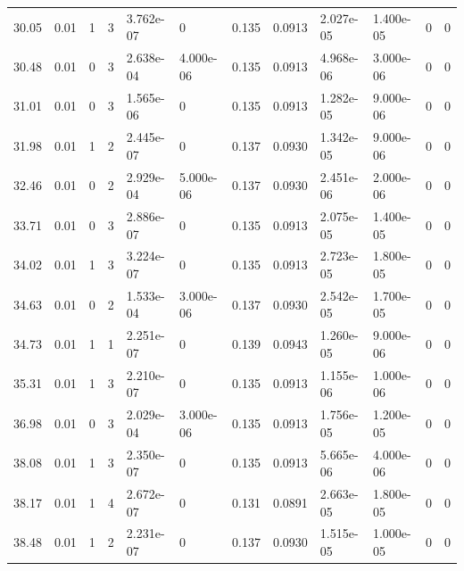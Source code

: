 \documentclass[preview]{standalone}
\begin{document}
{{\begin{tabular}{L{1.2cm}C{1.2cm} C{0.3cm}C{0.5cm} C{1.4cm}C{1.4cm} C{1.4cm}C{1.4cm} C{1.6cm}C{1.6cm} C{1.6cm}C{1.6cm}}
  30.05  &  0.01  & 1     &  3 &  3.762e-07  & 0  &  0.135&   0.0913& 2.027e-05 & 1.400e-05   &  0 & 0  \\ 
  30.48  &  0.01  & 0     &  3 &  2.638e-04  & 4.000e-06  &  0.135&   0.0913& 4.968e-06 & 3.000e-06   &  0 & 0  \\ 
  31.01  &  0.01  & 0     &  3 &  1.565e-06  & 0  &  0.135&   0.0913& 1.282e-05 & 9.000e-06   &  0 & 0  \\ 
  31.98  &  0.01  & 1     &  2 &  2.445e-07  & 0  &  0.137&   0.0930& 1.342e-05 & 9.000e-06   &  0 & 0  \\ 
  32.46  &  0.01  & 0     &  2 &  2.929e-04  & 5.000e-06  &  0.137&   0.0930& 2.451e-06 & 2.000e-06   &  0 & 0  \\ 
  33.71  &  0.01  & 0     &  3 &  2.886e-07  & 0  &  0.135&   0.0913& 2.075e-05 & 1.400e-05   &  0 & 0  \\ 
  34.02  &  0.01  & 1     &  3 &  3.224e-07  & 0  &  0.135&   0.0913& 2.723e-05 & 1.800e-05   &  0 & 0  \\ 
  34.63  &  0.01  & 0     &  2 &  1.533e-04  & 3.000e-06  &  0.137&   0.0930& 2.542e-05 & 1.700e-05   &  0 & 0  \\ 
  34.73  &  0.01  & 1     &  1 &  2.251e-07  & 0  &  0.139&   0.0943& 1.260e-05 & 9.000e-06   &  0 & 0  \\ 
  35.31  &  0.01  & 1     &  3 &  2.210e-07  & 0  &  0.135&   0.0913& 1.155e-06 & 1.000e-06   &  0 & 0  \\ 
  36.98  &  0.01  & 0     &  3 &  2.029e-04  & 3.000e-06  &  0.135&   0.0913& 1.756e-05 & 1.200e-05   &  0 & 0  \\ 
  38.08  &  0.01  & 1     &  3 &  2.350e-07  & 0  &  0.135&   0.0913& 5.665e-06 & 4.000e-06   &  0 & 0  \\ 
  38.17  &  0.01  & 1     &  4 &  2.672e-07  & 0  &  0.131&   0.0891& 2.663e-05 & 1.800e-05   &  0 & 0  \\ 
  38.48  &  0.01  & 1     &  2 &  2.231e-07  & 0  &  0.137&   0.0930& 1.515e-05 & 1.000e-05   &  0 & 0  \\ 
\hline 
\end{tabular} 

}}
\end{document}
